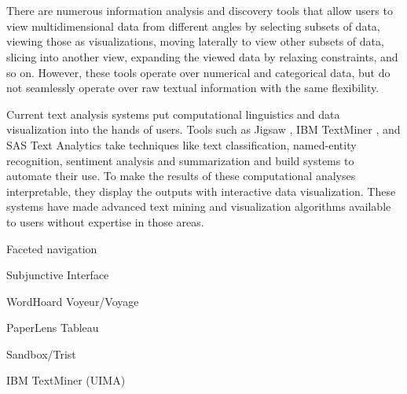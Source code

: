 




\section{}

There are numerous information analysis and discovery tools that allow users to view multidimensional data from different angles by selecting subsets of data, viewing those as visualizations, moving laterally to view other subsets of data, slicing into another view, expanding the viewed data by relaxing constraints, and so on.  However, these tools operate over numerical and categorical data, but do not seamlessly operate over raw textual information with the same flexibility. 

Current text analysis systems put computational linguistics and data visualization into the hands of users. Tools such as Jigsaw \cite{}, IBM TextMiner \cite{}, and SAS Text Analytics \cite{} take techniques like text classification, named-entity recognition, sentiment analysis and summarization and build systems to automate their use. To make the results of these computational analyses interpretable, they display the outputs with interactive data visualization. These systems have made advanced text mining and visualization algorithms available to users without expertise in those areas.



Faceted navigation

Subjunctive Interface

WordHoard
Voyeur/Voyage

PaperLens
Tableau

Sandbox/Trist

IBM TextMiner (UIMA)
